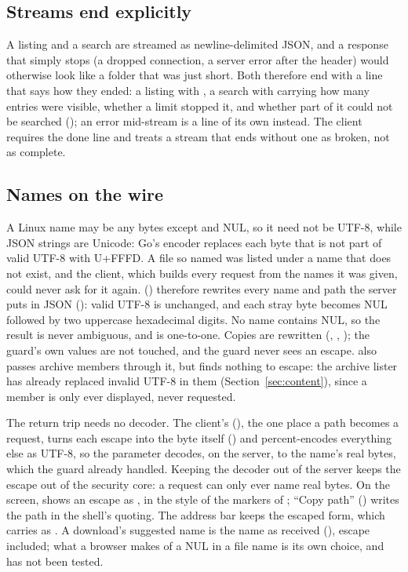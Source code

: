 \subsection{Streams end explicitly}

A listing and a search are streamed as newline-delimited JSON, and a response that simply
stops (a dropped connection, a server error after the header) would otherwise look like a
folder that was just short.  Both therefore end with a line that says how they ended: a
listing with , a search with  carrying
how many entries were visible, whether a limit stopped it, and whether part of it could
not be searched (); an error mid-stream is a line of its own instead.
The client requires the done line and treats a stream that ends without one as broken,
not as complete.

\subsection{Names on the wire}
\label{sec:wirenames}

A Linux name may be any bytes except \code{/} and NUL, so it need not be UTF-8, while
JSON strings are Unicode: Go's encoder replaces each byte that is not part of valid
UTF-8 with U+FFFD.  A file so named was listed under a name that does not exist, and
the client, which builds every request from the names it was given, could never ask
for it again.   () therefore rewrites every
name and path the server puts in JSON (): valid UTF-8 is unchanged, and each
stray byte becomes NUL followed by two uppercase hexadecimal digits.  No name contains
NUL, so the result is never ambiguous, and  is one-to-one.  Copies are
rewritten (, , ); the guard's own
values are not touched, and the guard never sees an escape.   also
passes archive members through it, but finds nothing to escape: the archive lister has
already replaced invalid UTF-8 in them (Section~\ref{sec:content}), since a member is
only ever displayed, never requested.

The return trip needs no decoder.  The client's 
(), the one place a path becomes a request, turns each
escape into the byte itself () and percent-encodes everything else as UTF-8,
so the  parameter decodes, on the server, to the name's real bytes, which
the guard already handled.  Keeping the decoder out of the server keeps the escape out
of the security core: a request can only ever name real bytes.  On the screen,
 shows an escape as , in the style
of the markers of ; ``Copy path'' () writes the path in
the shell's  quoting.  The address bar keeps the escaped form, which
 carries as .  A download's suggested name is
the name as received (), escape included; what a browser makes of a NUL in a
file name is its own choice, and has not been tested.

